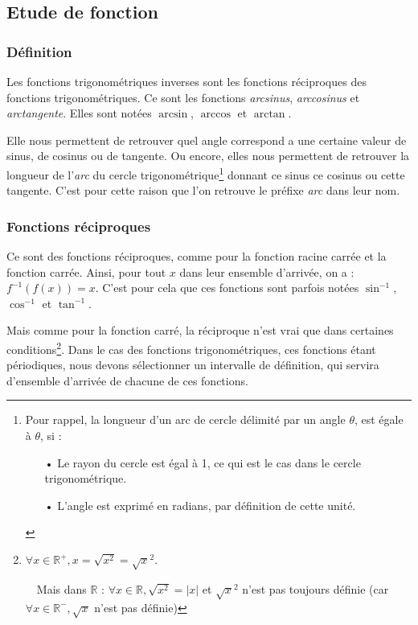 \documentclass[a4paper]{article}
\begin{document}
	\subsection*{Etude de fonction}
		\subsubsection*{Définition}

			Les fonctions trigonométriques inverses sont les fonctions réciproques des fonctions trigonométriques.
			Ce sont les fonctions \emph{arcsinus}, \emph{arccosinus} et \emph{arctangente}. Elles sont notées $\arcsin$, $\arccos$ et $\arctan$.

			Elle nous permettent de retrouver quel angle correspond a une certaine valeur de sinus, de cosinus ou de tangente.
			Ou encore, elles nous permettent de retrouver la longueur de l'\textit{arc} du cercle trigonométrique\footnote{
				Pour rappel, la longueur d'un arc de cercle délimité par un angle $\theta$, est égale à $\theta$, si :
				\begin{itemize}
					\item [•] Le rayon du cercle est égal à 1, ce qui est le cas dans le cercle trigonométrique.
					\item [•] L'angle est exprimé en radians, par définition de cette unité.
				\end{itemize}
				\vspace*{-0.25cm}
				} donnant ce sinus ce cosinus ou cette tangente. C'est pour cette raison que  l'on retrouve le préfixe \textit{arc} dans leur nom.
			
			
			\vspace*{-0.25cm}

			\subsubsection*{Fonctions réciproques}

			Ce sont des fonctions réciproques, comme pour la fonction racine carrée et la fonction carrée.
			Ainsi, pour tout $x$ dans leur ensemble d'arrivée, on a : $f^{-1}(f(x)) = x$.
			C'est pour cela que ces fonctions sont parfois notées $\sin^{-1}$, $\cos^{-1}$ et $\tan^{-1}$.

			Mais comme pour la fonction carré, la réciproque n'est vrai que dans certaines conditions\footnote{$\forall x \in \mathbb{R}^{+}, x = \sqrt{x^2} = \sqrt{x}^2$.
			
			~~Mais dans $\mathbb{R}$ : $\forall x \in \mathbb{R}, \sqrt{x^2} = |x|$ et $\sqrt{x}^2$ n'est pas toujours définie (car $\forall x \in \mathbb{R}^-, \sqrt{x}$ n'est pas définie)}.
			Dans le cas des fonctions trigonométriques, ces fonctions étant périodiques,
			nous devons sélectionner un intervalle de définition, qui servira d'ensemble d'arrivée de chacune de ces fonctions.
			
\end{document}
